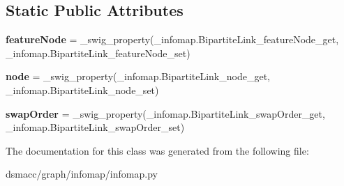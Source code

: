 \subsection*{Static Public Attributes}
\begin{DoxyCompactItemize}
\item 
\mbox{\label{classdsmacc_1_1graph_1_1infomap_1_1infomap_1_1BipartiteLink_ad6adb640f31da953d93ec94eeeab483e}} 
{\bfseries feature\+Node} = \+\_\+swig\+\_\+property(\+\_\+infomap.\+Bipartite\+Link\+\_\+feature\+Node\+\_\+get, \+\_\+infomap.\+Bipartite\+Link\+\_\+feature\+Node\+\_\+set)
\item 
\mbox{\label{classdsmacc_1_1graph_1_1infomap_1_1infomap_1_1BipartiteLink_a21560972d906f474c0d437afb342b179}} 
{\bfseries node} = \+\_\+swig\+\_\+property(\+\_\+infomap.\+Bipartite\+Link\+\_\+node\+\_\+get, \+\_\+infomap.\+Bipartite\+Link\+\_\+node\+\_\+set)
\item 
\mbox{\label{classdsmacc_1_1graph_1_1infomap_1_1infomap_1_1BipartiteLink_a47cd5302f2bac53d9fe89bc0b79b15ef}} 
{\bfseries swap\+Order} = \+\_\+swig\+\_\+property(\+\_\+infomap.\+Bipartite\+Link\+\_\+swap\+Order\+\_\+get, \+\_\+infomap.\+Bipartite\+Link\+\_\+swap\+Order\+\_\+set)
\end{DoxyCompactItemize}


The documentation for this class was generated from the following file\+:\begin{DoxyCompactItemize}
\item 
dsmacc/graph/infomap/infomap.\+py\end{DoxyCompactItemize}
